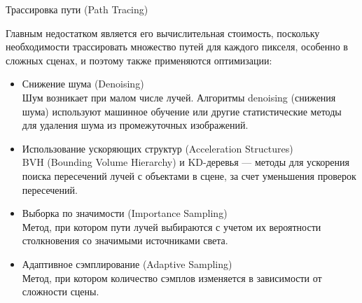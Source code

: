 \documentclass{beamer}
\begin{document}
\begin{frame}{Трассировка пути (Path Tracing)}
{		Главным недостатком является его	вычислительная стоимость, поскольку необходимости трассировать множество путей для каждого пикселя, особенно в сложных сценах, 
		и поэтому также применяются оптимизации:
			\begin{itemize}
				\item 
				Снижение шума (Denoising)\\
				Шум возникает при малом числе лучей. 
				Алгоритмы denoising (снижения шума) используют машинное обучение или другие статистические методы для удаления шума из промежуточных изображений.
				\item 
				Использование ускоряющих структур (Acceleration Structures)\\
				BVH (Bounding Volume Hierarchy) и KD-деревья --- методы для ускорения поиска пересечений лучей с объектами в сцене, за счет уменьшения проверок пересечений.
				\item 
				Выборка по значимости (Importance Sampling)\\
				Метод, при котором пути лучей выбираются с учетом их вероятности столкновения со значимыми источниками света.
				\item 
				Адаптивное сэмплирование (Adaptive Sampling)\\
				Метод, при котором количество сэмплов изменяется в зависимости от сложности сцены. 
			\end{itemize}


			

		}

	\end{frame}


\end{document}
